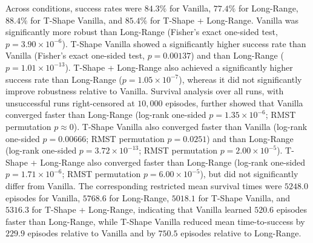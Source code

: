 \documentclass[letterpaper]{article}
\begin{document}
Across conditions, success rates were $84.3\%$ for Vanilla, $77.4\%$ for Long-Range, $88.4\%$ for T-Shape Vanilla, and $85.4\%$ for T-Shape + Long-Range. Vanilla was significantly more robust than Long-Range (Fisher's exact one-sided test, $p=3.90 \times 10^{-6}$). T-Shape Vanilla showed a significantly higher success rate than Vanilla (Fisher's exact one-sided test, $p=0.00137$) and than Long-Range ($p=1.01 \times 10^{-13}$). T-Shape + Long-Range also achieved a significantly higher success rate than Long-Range ($p=1.05 \times 10^{-7}$), whereas it did not significantly improve robustness relative to Vanilla. Survival analysis over all runs, with unsuccessful runs right-censored at $10{,}000$ episodes, further showed that Vanilla converged faster than Long-Range (log-rank one-sided $p=1.35 \times 10^{-6}$; RMST permutation $p \approx 0$). T-Shape Vanilla also converged faster than Vanilla (log-rank one-sided $p=0.00666$; RMST permutation $p=0.0251$) and than Long-Range (log-rank one-sided $p=3.72 \times 10^{-13}$; RMST permutation $p=2.00 \times 10^{-5}$). T-Shape + Long-Range also converged faster than Long-Range (log-rank one-sided $p=1.71 \times 10^{-6}$; RMST permutation $p=6.00 \times 10^{-5}$), but did not significantly differ from Vanilla. The corresponding restricted mean survival times were $5248.0$ episodes for Vanilla, $5768.6$ for Long-Range, $5018.1$ for T-Shape Vanilla, and $5316.3$ for T-Shape + Long-Range, indicating that Vanilla learned $520.6$ episodes faster than Long-Range, while T-Shape Vanilla reduced mean time-to-success by $229.9$ episodes relative to Vanilla and by $750.5$ episodes relative to Long-Range.





\end{document}
